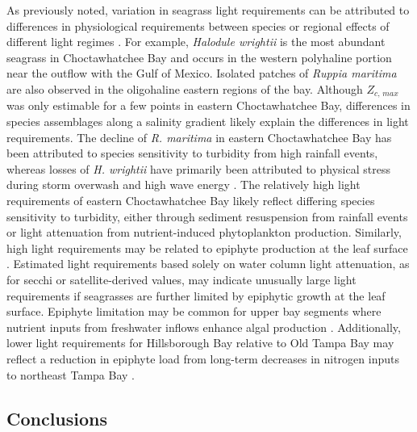 \documentclass[letterpaper,12pt,oneside]{article}\usepackage[]{graphicx}\usepackage[]{color}
\begin{document}
As previously noted, variation in seagrass light requirements can be attributed to differences in physiological requirements between species or regional effects of different light regimes \citep{Choice14}.  For example, \textit{Halodule wrightii} is the most abundant seagrass in Choctawhatchee Bay and occurs in the western polyhaline portion near the outflow with the Gulf of Mexico.  Isolated patches of \textit{Ruppia maritima} are also observed in the oligohaline eastern regions of the bay. Although $Z_{c,\,max}$ was only estimable for a few points in eastern Choctawhatchee Bay, differences in species assemblages along a salinity gradient likely explain the differences in light requirements. The decline of \textit{R. maritima} in eastern Choctawhatchee Bay has been attributed to species sensitivity to turbidity from high rainfall events, whereas losses of \textit{H. wrightii} have primarily been attributed to physical stress during storm overwash and high wave energy .  The relatively high light requirements of eastern Choctawhatchee Bay likely reflect differing species sensitivity to turbidity, either through sediment resuspension from rainfall events or light attenuation from nutrient-induced phytoplankton production.  Similarly, high light requirements may be related to epiphyte production at the leaf surface \citep{Kemp04}.  Estimated light requirements based solely on water column light attenuation, as for secchi or satellite-derived values, may indicate unusually large light requirements if seagrasses are further limited by epiphytic growth at the leaf surface.  Epiphyte limitation may be common for upper bay segments where nutrient inputs from freshwater inflows enhance algal production \citep{Kemp04}.  Additionally, lower light requirements for Hillsborough Bay relative to Old Tampa Bay may reflect a reduction in epiphyte load from long-term decreases in nitrogen inputs to northeast Tampa Bay \citep{Dawes10}.

\subsection{Conclusions}
\end{document}
